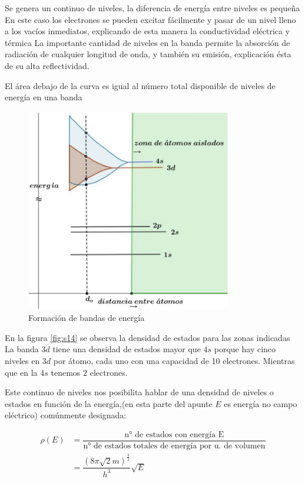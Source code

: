 Se genera un continuo de niveles, la diferencia de energía entre niveles es pequeña En este caso los electrones se pueden excitar fácilmente y pasar de un nivel lleno a los vacíos inmediatos, explicando de esta manera la conductividad eléctrica y térmica La importante cantidad de niveles en la banda permite la absorción de radiación de cualquier longitud de onda, y también su emisión, explicación  ésta de su alta reflectividad.

El área debajo de la curva es igual al número total disponible de niveles de energía en una banda

\begin{figure}[H]
    \centering
    \includegraphics[width=0.8\textwidth]{./Figures/fig_s13}
	\caption{Formación de bandas de energía}
	\label{fig:s13}
\end{figure}

En la figura \ref{fig:s14} se observa la densidad de estados para las zonas indicadas La banda $3d$ tiene una densidad de estados mayor que $4s$ porque hay cinco niveles en $3d$ por átomo, cada uno con una capacidad de 10 electrones. Mientras que en la $4s$ tenemos $2$ electrones.

Este continuo de niveles nos posibilita hablar de una densidad de niveles o estados en función de la energía,(en esta parte del apunte $E$ es energía no campo eléctrico) comúnmente designada:

\begin{equation}
\begin{aligned}
	\rho(E)&= \dfrac{\text{n° de estados con energía E}}{\text{n° de estados totales de energía por u. de volumen}} \\
	&= \dfrac{(8 \pi \sqrt{2} m )^{\frac{3}{2}}}{h^{3}}\sqrt{E}
\end{aligned}
\end{equation}

